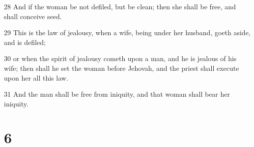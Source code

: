 \par 28 And if the woman be not defiled, but be clean; then she shall be free, and shall conceive seed.
\par 29 This is the law of jealousy, when a wife, being under her husband, goeth aside, and is defiled;
\par 30 or when the spirit of jealousy cometh upon a man, and he is jealous of his wife; then shall he set the woman before Jehovah, and the priest shall execute upon her all this law.
\par 31 And the man shall be free from iniquity, and that woman shall bear her iniquity.

\chapter{6}

